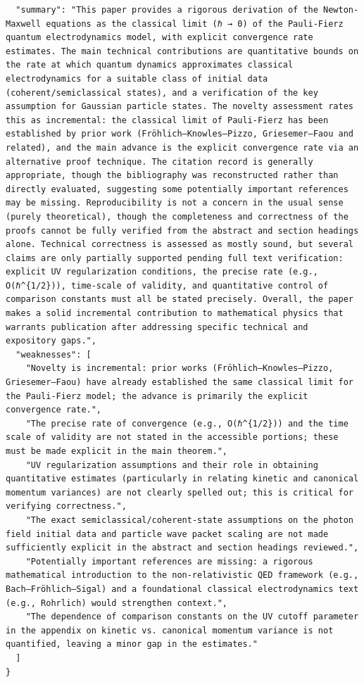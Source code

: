 \documentclass[11pt]{article}
\begin{document}
\begin{verbatim}
  "summary": "This paper provides a rigorous derivation of the Newton-Maxwell equations as the classical limit (ℏ → 0) of the Pauli-Fierz quantum electrodynamics model, with explicit convergence rate estimates. The main technical contributions are quantitative bounds on the rate at which quantum dynamics approximates classical electrodynamics for a suitable class of initial data (coherent/semiclassical states), and a verification of the key assumption for Gaussian particle states. The novelty assessment rates this as incremental: the classical limit of Pauli-Fierz has been established by prior work (Fröhlich–Knowles–Pizzo, Griesemer–Faou and related), and the main advance is the explicit convergence rate via an alternative proof technique. The citation record is generally appropriate, though the bibliography was reconstructed rather than directly evaluated, suggesting some potentially important references may be missing. Reproducibility is not a concern in the usual sense (purely theoretical), though the completeness and correctness of the proofs cannot be fully verified from the abstract and section headings alone. Technical correctness is assessed as mostly sound, but several claims are only partially supported pending full text verification: explicit UV regularization conditions, the precise rate (e.g., O(ℏ^{1/2})), time-scale of validity, and quantitative control of comparison constants must all be stated precisely. Overall, the paper makes a solid incremental contribution to mathematical physics that warrants publication after addressing specific technical and expository gaps.",
  "weaknesses": [
    "Novelty is incremental: prior works (Fröhlich–Knowles–Pizzo, Griesemer–Faou) have already established the same classical limit for the Pauli-Fierz model; the advance is primarily the explicit convergence rate.",
    "The precise rate of convergence (e.g., O(ℏ^{1/2})) and the time scale of validity are not stated in the accessible portions; these must be made explicit in the main theorem.",
    "UV regularization assumptions and their role in obtaining quantitative estimates (particularly in relating kinetic and canonical momentum variances) are not clearly spelled out; this is critical for verifying correctness.",
    "The exact semiclassical/coherent-state assumptions on the photon field initial data and particle wave packet scaling are not made sufficiently explicit in the abstract and section headings reviewed.",
    "Potentially important references are missing: a rigorous mathematical introduction to the non-relativistic QED framework (e.g., Bach–Fröhlich–Sigal) and a foundational classical electrodynamics text (e.g., Rohrlich) would strengthen context.",
    "The dependence of comparison constants on the UV cutoff parameter in the appendix on kinetic vs. canonical momentum variance is not quantified, leaving a minor gap in the estimates."
  ]
}
\end{verbatim}
\end{document}
